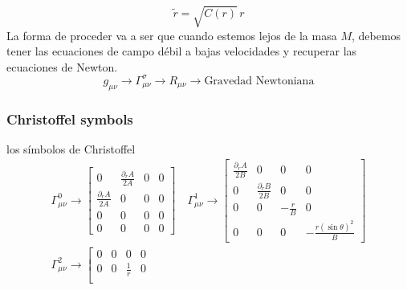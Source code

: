 \begin{equation}
    \tilde{r}=\sqrt{C(r)} \, r
\end{equation}
La forma de proceder va a ser  que cuando estemos lejos de la masa $M$, debemos tener las ecuaciones de campo débil a bajas velocidades y recuperar las ecuaciones de Newton.
\begin{equation*}
    g_{\mu \nu} \rightarrow \Gamma_{\mu \nu}^\sigma \rightarrow R_{\mu \nu} \rightarrow \text{Gravedad Newtoniana}
\end{equation*}


\subsubsection{Christoffel symbols}
los símbolos de Christoffel
\begin{equation}
    \begin{gathered}
        \Gamma_{\mu \nu}^0 \rightarrow\left[\begin{array}{cccc}
                0                        & \frac{\partial_r A}{2 A} & 0 & 0 \\
                \frac{\partial_r A}{2 A} & 0                        & 0 & 0 \\
                0                        & 0                        & 0 & 0 \\
                0                        & 0                        & 0 & 0
            \end{array}\right]
        \quad
        \Gamma_{\mu \nu}^1 \rightarrow\left[\begin{array}{cccc}
                \frac{\partial_r A}{2 B} & 0                        & 0            & 0                           \\
                0                        & \frac{\partial_r B}{2 B} & 0            & 0                           \\
                0                        & 0                        & -\frac{r}{B} & 0                           \\
                0                        & 0                        & 0            & -\frac{r(\sin \theta)^2}{B}
            \end{array}\right] \\
        \Gamma_{\mu \nu}^2 \rightarrow\left[\begin{array}{cccc}
                0 & 0           & 0           & 0                        \\
                0 & 0           & \frac{1}{r} & 0                        \\

\end{array}
\end{gathered}
\end{equation}
